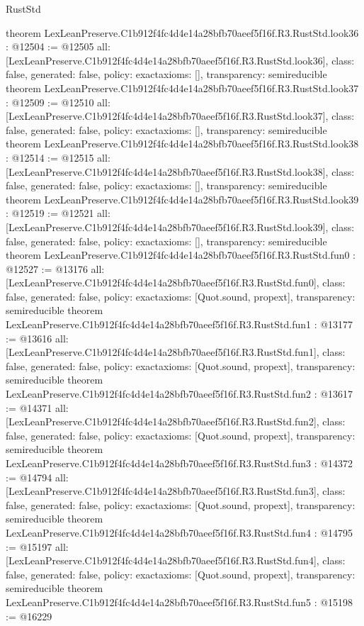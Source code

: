 \begin{lexlean}{RustStd}
\begin{coremodule}
{}
theorem LexLeanPreserve.C1b912f4fc4d4e14a28bfb70aeef5f16f.R3.RustStd.look36 : @12504 := @12505 {
  all: [LexLeanPreserve.C1b912f4fc4d4e14a28bfb70aeef5f16f.R3.RustStd.look36],
  class: false,
  generated: false,
  policy: exact{axioms: []},
  transparency: semireducible
}
theorem LexLeanPreserve.C1b912f4fc4d4e14a28bfb70aeef5f16f.R3.RustStd.look37 : @12509 := @12510 {
  all: [LexLeanPreserve.C1b912f4fc4d4e14a28bfb70aeef5f16f.R3.RustStd.look37],
  class: false,
  generated: false,
  policy: exact{axioms: []},
  transparency: semireducible
}
theorem LexLeanPreserve.C1b912f4fc4d4e14a28bfb70aeef5f16f.R3.RustStd.look38 : @12514 := @12515 {
  all: [LexLeanPreserve.C1b912f4fc4d4e14a28bfb70aeef5f16f.R3.RustStd.look38],
  class: false,
  generated: false,
  policy: exact{axioms: []},
  transparency: semireducible
}
theorem LexLeanPreserve.C1b912f4fc4d4e14a28bfb70aeef5f16f.R3.RustStd.look39 : @12519 := @12521 {
  all: [LexLeanPreserve.C1b912f4fc4d4e14a28bfb70aeef5f16f.R3.RustStd.look39],
  class: false,
  generated: false,
  policy: exact{axioms: []},
  transparency: semireducible
}
theorem LexLeanPreserve.C1b912f4fc4d4e14a28bfb70aeef5f16f.R3.RustStd.fun0 : @12527 := @13176 {
  all: [LexLeanPreserve.C1b912f4fc4d4e14a28bfb70aeef5f16f.R3.RustStd.fun0],
  class: false,
  generated: false,
  policy: exact{axioms: [Quot.sound, propext]},
  transparency: semireducible
}
theorem LexLeanPreserve.C1b912f4fc4d4e14a28bfb70aeef5f16f.R3.RustStd.fun1 : @13177 := @13616 {
  all: [LexLeanPreserve.C1b912f4fc4d4e14a28bfb70aeef5f16f.R3.RustStd.fun1],
  class: false,
  generated: false,
  policy: exact{axioms: [Quot.sound, propext]},
  transparency: semireducible
}
theorem LexLeanPreserve.C1b912f4fc4d4e14a28bfb70aeef5f16f.R3.RustStd.fun2 : @13617 := @14371 {
  all: [LexLeanPreserve.C1b912f4fc4d4e14a28bfb70aeef5f16f.R3.RustStd.fun2],
  class: false,
  generated: false,
  policy: exact{axioms: [Quot.sound, propext]},
  transparency: semireducible
}
theorem LexLeanPreserve.C1b912f4fc4d4e14a28bfb70aeef5f16f.R3.RustStd.fun3 : @14372 := @14794 {
  all: [LexLeanPreserve.C1b912f4fc4d4e14a28bfb70aeef5f16f.R3.RustStd.fun3],
  class: false,
  generated: false,
  policy: exact{axioms: [Quot.sound, propext]},
  transparency: semireducible
}
theorem LexLeanPreserve.C1b912f4fc4d4e14a28bfb70aeef5f16f.R3.RustStd.fun4 : @14795 := @15197 {
  all: [LexLeanPreserve.C1b912f4fc4d4e14a28bfb70aeef5f16f.R3.RustStd.fun4],
  class: false,
  generated: false,
  policy: exact{axioms: [Quot.sound, propext]},
  transparency: semireducible
}
theorem LexLeanPreserve.C1b912f4fc4d4e14a28bfb70aeef5f16f.R3.RustStd.fun5 : @15198 := @16229 {
}
\end{coremodule}
\end{lexlean}
